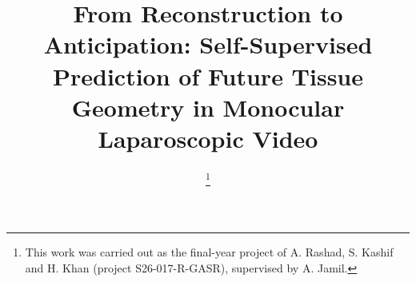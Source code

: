 \documentclass[conference]{IEEEtran}
\begin{document}
\title{From Reconstruction to Anticipation: Self-Supervised Prediction of
Future Tissue Geometry in Monocular Laparoscopic Video}

\author{
\thanks{This work was carried out as the final-year project of A. Rashad, S. Kashif
and H. Khan (project S26-017-R-GASR), supervised by A. Jamil.}
}

\maketitle
\end{document}

